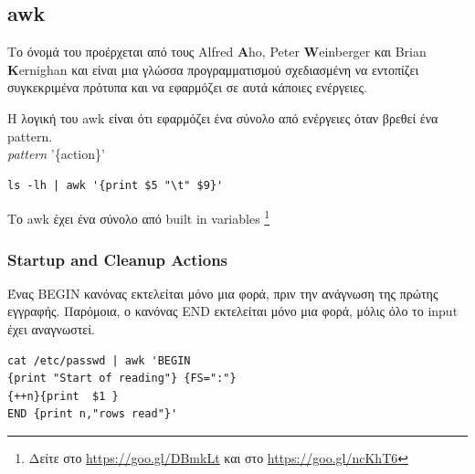 \subsection{awk}

Το όνομά του προέρχεται από τους Alfred \textbf{A}ho, Peter \textbf{W}einberger και Brian \textbf{K}ernighan και είναι μια γλώσσα προγραμματισμού σχεδιασμένη να εντοπίζει συγκεκριμένα πρότυπα και να εφαρμόζει σε αυτά κάποιες ενέργειες.  

Η λογική του awk είναι ότι εφαρμόζει ένα σύνολο από ενέργειες όταν βρεθεί ένα pattern.\\
\textit{pattern} '\{action\}' \\
\begin{lstlisting}
ls -lh | awk '{print $5 "\t" $9}'
\end{lstlisting}

Το awk έχει ένα σύνολο από built in variables \footnote{Δείτε στο \href{https://goo.gl/DBmkLt}{https://goo.gl/DBmkLt} και στο \href{https://goo.gl/ncKhT6}{https://goo.gl/ncKhT6}}

\subsubsection{Startup and Cleanup Actions}
Ένας BEGIN κανόνας εκτελείται μόνο μια φορά, πριν την ανάγνωση της πρώτης εγγραφής. Παρόμοια, ο κανόνας END εκτελείται μόνο μια φορά, μόλις όλο το input έχει αναγνωστεί.

\begin{lstlisting}
cat /etc/passwd | awk 'BEGIN 
{print "Start of reading"} {FS=":"} 
{++n}{print  $1 } 
END {print n,"rows read"}'
\end{lstlisting}

